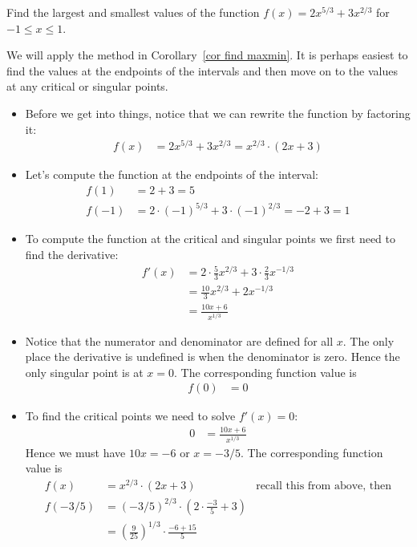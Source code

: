 \begin{eg}\label{APPglobalMaxMinA}
Find the largest and smallest values of the function $f(x)=2x^{5/3}+3x^{2/3}$ for $-1\le
x\le 1$.

\soln We will apply the method in Corollary~\ref{cor find maxmin}. It is perhaps easiest
to find the values at the endpoints of the intervals and then move on to the values at
any critical or singular points.
\begin{itemize}
 \item Before we get into things, notice that we can rewrite the function by factoring
it:
\begin{align*}
  f(x) &= 2x^{5/3}+3x^{2/3} = x^{2/3} \cdot \left(2x + 3\right)
\end{align*}
 \item Let's compute the function at the endpoints of the interval:
\begin{align*}
  f(1) &= 2 +3 = 5 \\
  f(-1) &= 2 \cdot(-1)^{5/3} + 3\cdot (-1)^{2/3} =-2 + 3 = 1
\end{align*}
\item To compute the function at the critical and singular points we first need to find
the derivative:
\begin{align*}
  f'(x) &= 2 \cdot \frac{5}{3} x^{2/3} + 3 \cdot \frac{2}{3} x^{-1/3} \\
  &= \frac{10}{3} x^{2/3} + 2 x^{-1/3}\\
  &= \frac{10 x + 6}{x^{1/3}}
\end{align*}
\item Notice that the numerator and denominator are defined for all $x$. The only place
the derivative is undefined is when the denominator is zero. Hence the only singular
point is at $x=0$. The corresponding function value is
\begin{align*}
  f(0) &= 0
\end{align*}
\item To find the critical points we need to solve $f'(x) = 0$:
\begin{align*}
  0 &= \frac{10 x + 6}{x^{1/3}}
\end{align*}
Hence we must have $10x=-6$ or $x=-3/5$. The corresponding function value is
\begin{align*}
  f(x) &= x^{2/3} \cdot \left(2x + 3\right) & \text{recall this from above, then}\\
  f(-3/5) &= (-3/5)^{2/3} \cdot\left(2 \cdot \frac{-3}{5} + 3 \right) \\
  &= \left(\frac{9}{25}\right)^{1/3} \cdot \frac{-6 + 15}{5} \\

\end{align*}
\end{itemize}
\end{eg}

